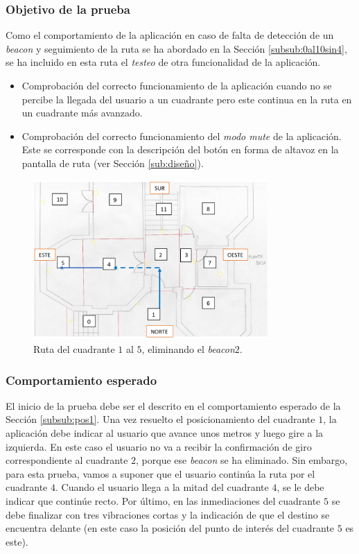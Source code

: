 \subsubsection*{Objetivo de la prueba}

Como el comportamiento de la aplicación en caso de falta de detección de un \textit{beacon} y seguimiento de la ruta se ha abordado en la Sección \ref{subsub:0al10sin4}, se ha incluido en esta ruta el \textit{testeo} de otra funcionalidad de la aplicación. 

\begin{itemize}
	\item Comprobación del correcto funcionamiento de la aplicación cuando no se percibe la llegada del usuario a un cuadrante pero este continua en la ruta en un cuadrante más avanzado.
	
	\item Comprobación del correcto funcionamiento del \textit{modo mute} de la aplicación. Este se corresponde con la descripción del botón en forma de altavoz en la pantalla de ruta (ver Sección \ref{sub:diseño}). 
\end{itemize}

\begin{figure}[t]
	\centering
	\includegraphics[width=0.8\textwidth]{Imagenes/Evaluacion/del1al5sin2}
	\caption{Ruta del cuadrante $1$ al $5$, eliminando el \textit{beacon$2$}.}
	\label{fig:del1al5sin2}
\end{figure}

\subsubsection*{Comportamiento esperado}

El inicio de la prueba debe ser el descrito en el comportamiento esperado de la Sección \ref{subsub:pos1}. Una vez resuelto el posicionamiento del cuadrante $1$, la aplicación debe indicar al usuario que avance unos metros y luego gire a la izquierda. En este caso el usuario no va a recibir la confirmación de giro correspondiente al cuadrante $2$, porque ese \textit{beacon} se ha eliminado. Sin embargo, para esta prueba, vamos a suponer que el usuario continúa la ruta por el cuadrante $4$. Cuando el usuario llega a la mitad del cuadrante $4$, se le debe indicar que continúe recto. Por último, en las inmediaciones del cuadrante $5$ se debe finalizar con tres vibraciones cortas y la indicación de que el destino se encuentra delante (en este caso la posición del punto de interés del cuadrante $5$ es este).

